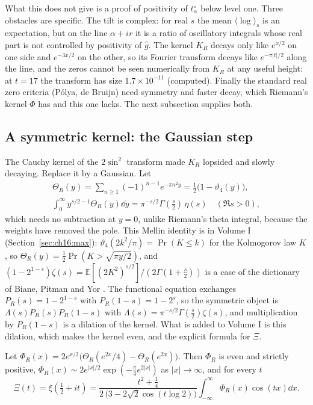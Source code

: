 What this does not give is a proof of positivity of $t^\circ_\alpha$ below level one. Three obstacles are specific. The tilt is complex: for real $s$ the mean $\langle\log\rangle_s$ is an expectation, but on the line $\alpha+ir$ it is a ratio of oscillatory integrals whose real part is not controlled by positivity of $\hat g$. The kernel $K_R$ decays only like $e^{x/2}$ on one side and $e^{-3x/2}$ on the other, so its Fourier transform decays like $e^{-\pi|t|/2}$ along the line, and the zeros cannot be seen numerically from $K_R$ at any useful height: at $t=17$ the transform has size $1.7\times10^{-11}$ (computed). Finally the standard real zero criteria (P\'olya, de Bruijn) need symmetry and faster decay, which Riemann's kernel $\Phi$ has and this one lacks. The next subsection supplies both.

\subsection{A symmetric kernel: the Gaussian step}
The Cauchy kernel of the $2\sin^2$ transform made $K_R$ lopsided and slowly decaying. Replace it by a Gaussian. Let
\begin{multline*}
\Theta_R(y)=\sum_{n\ge1}(-1)^{n-1}e^{-\pi n^2y}=\tfrac12\big(1-\vartheta_4(y)\big),\\
\int_0^\infty y^{s/2-1}\Theta_R(y)\dd y=\pi^{-s/2}\Gamma(\tfrac s2)\,\eta(s)\quad(\Re s>0),
\end{multline*}
which needs no subtraction at $y=0$, unlike Riemann's theta integral, because the weights have removed the pole. This Mellin identity is in Volume I (Section~\ref{sec:ch16:max}): $\vartheta_4(2k^2/\pi)=\Pr(K\le k)$ for the Kolmogorov law $K$, so $\Theta_R(y)=\frac12\Pr(K>\sqrt{\pi y/2})$, and $(1-2^{1-s})\zeta(s)=\mathbb E[(2K^2)^{s/2}]/(2\Gamma(1+\frac s2))$ is a case of the dictionary of Biane, Pitman and Yor \cite{BPY01}. The functional equation exchanges $P_R(s)=1-2^{1-s}$ with $P_R(1-s)=1-2^s$, so the symmetric object is $\Lambda(s)P_R(s)P_R(1-s)$ with $\Lambda(s)=\pi^{-s/2}\Gamma(\frac s2)\zeta(s)$, and multiplication by $P_R(1-s)$ is a dilation of the kernel. What is added to Volume I is this dilation, which makes the kernel even, and the explicit formula for $\Xi$.
\begin{theorem}\label{ct:thm:symkernel}
Let $\Phi_R(x)=2e^{x/2}\big(\Theta_R(e^{2x}/4)-\Theta_R(e^{2x})\big)$. Then $\Phi_R$ is even and strictly positive, $\Phi_R(x)\sim2e^{|x|/2}\exp(-\frac\pi4e^{2|x|})$ as $|x|\to\infty$, and for every $t$
\[
\Xi(t)=\xi(\tfrac12+it)=\frac{t^2+\frac14}{2\,\big(3-2\sqrt2\cos(t\log2)\big)}\int_{-\infty}^\infty\Phi_R(x)\cos(tx)\dd x .
\]
\end{theorem}
